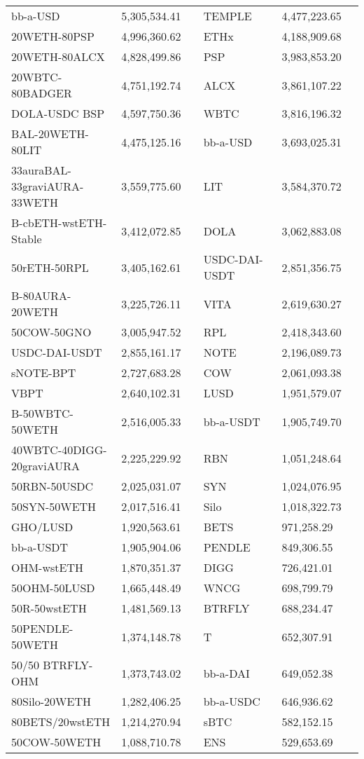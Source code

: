 \begin{longtable}{@{}p{0.25\linewidth}p{0.25\linewidth}p{0.25\linewidth}p{0.25\linewidth}@{}}
bb-a-USD & 5,305,534.41 & TEMPLE &4,477,223.65 \\
20WETH-80PSP & 4,996,360.62 & ETHx &4,188,909.68 \\
20WETH-80ALCX & 4,828,499.86 & PSP &3,983,853.20 \\
20WBTC-80BADGER & 4,751,192.74 & ALCX &3,861,107.22 \\
DOLA-USDC BSP & 4,597,750.36 & WBTC &3,816,196.32 \\
BAL-20WETH-80LIT & 4,475,125.16 & bb-a-USD &3,693,025.31 \\
33auraBAL-33graviAURA-33WETH & 3,559,775.60 & LIT &3,584,370.72 \\
B-cbETH-wstETH-Stable & 3,412,072.85 & DOLA &3,062,883.08 \\
50rETH-50RPL & 3,405,162.61 & USDC-DAI-USDT &2,851,356.75 \\
B-80AURA-20WETH & 3,225,726.11 & VITA &2,619,630.27 \\
50COW-50GNO & 3,005,947.52 & RPL &2,418,343.60 \\
USDC-DAI-USDT & 2,855,161.17 & NOTE &2,196,089.73 \\
sNOTE-BPT & 2,727,683.28 & COW &2,061,093.38 \\
VBPT & 2,640,102.31 & LUSD &1,951,579.07 \\
B-50WBTC-50WETH & 2,516,005.33 & bb-a-USDT &1,905,749.70 \\
40WBTC-40DIGG-20graviAURA & 2,225,229.92 & RBN &1,051,248.64 \\
50RBN-50USDC & 2,025,031.07 & SYN &1,024,076.95 \\
50SYN-50WETH & 2,017,516.41 & Silo &1,018,322.73 \\
GHO/LUSD & 1,920,563.61 & BETS &971,258.29 \\
bb-a-USDT & 1,905,904.06 & PENDLE &849,306.55 \\
OHM-wstETH & 1,870,351.37 & DIGG &726,421.01 \\
50OHM-50LUSD & 1,665,448.49 & WNCG &698,799.79 \\
50R-50wstETH & 1,481,569.13 & BTRFLY &688,234.47 \\
50PENDLE-50WETH & 1,374,148.78 & T &652,307.91 \\
50/50 BTRFLY-OHM & 1,373,743.02 & bb-a-DAI &649,052.38 \\
80Silo-20WETH & 1,282,406.25 & bb-a-USDC &646,936.62 \\
80BETS/20wstETH & 1,214,270.94 & sBTC &582,152.15 \\
50COW-50WETH & 1,088,710.78 & ENS &529,653.69 \\

\end{longtable}
